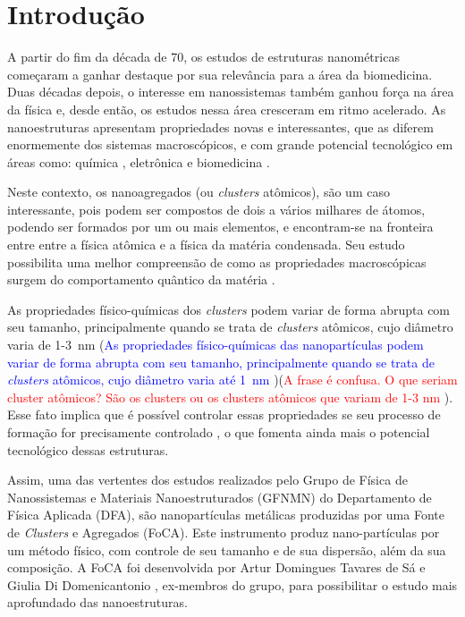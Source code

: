 \chapter{Introdução}

A partir do fim da década de 70, os estudos de estruturas nanométricas começaram a ganhar destaque por sua relevância para a área da biomedicina. Duas décadas depois, o interesse em nanossistemas também ganhou força na área da física e, desde então, os estudos nessa área cresceram em ritmo acelerado. As nanoestruturas apresentam propriedades novas e interessantes, que as diferem enormemente dos sistemas macroscópicos, e com grande potencial tecnológico em áreas como: química \cite{catalise}, eletrônica \cite{semicondutores} e biomedicina \cite{antimicrobial_effects, drug_delivery}.


Neste contexto, os nanoagregados (ou \textit{clusters} atômicos), são um caso interessante, pois podem ser compostos de dois a vários milhares de átomos, podendo ser formados por um ou mais elementos, e encontram-se na fronteira entre entre a física atômica e a física da matéria condensada.
Seu estudo possibilita uma melhor compreensão de como as propriedades macroscópicas surgem do comportamento quântico da matéria \cite{Heer,Brack}.

As propriedades físico-químicas dos \textit{clusters} podem variar de forma abrupta com seu tamanho, principalmente quando se trata de \textit{clusters} atômicos, cujo diâmetro varia de \mbox{1-3 nm} (\textcolor{blue}{As propriedades físico-químicas das nanopartículas podem variar de forma abrupta com seu tamanho, principalmente quando se trata de \textit{clusters} atômicos, cujo diâmetro varia até \mbox{1 nm}} )(\textcolor{red}{A frase é confusa. O que seriam cluster atômicos? São os clusters ou os clusters atômicos que variam de 1-3 nm} ). Esse fato implica que é possível controlar essas propriedades se seu processo de formação for precisamente controlado  \cite{energetic_thermodynamic}, o que fomenta ainda mais o potencial tecnológico dessas estruturas.


Assim, uma das vertentes dos estudos realizados pelo Grupo   de   Física   de   Nanossistemas   e Materiais  Nanoestruturados  (GFNMN)  do  Departamento de  Física  Aplicada  (DFA),  são nanopartículas metálicas produzidas por uma Fonte de \textit{Clusters} e Agregados (FoCA). Este instrumento produz nano-partículas por um método físico, com controle de seu tamanho e de sua dispersão, além da sua composição. A FoCA foi desenvolvida por Artur Domingues Tavares de Sá e Giulia Di Domenicantonio \cite{tese_artur}, ex-membros do grupo, para possibilitar o estudo mais aprofundado das nanoestruturas.

